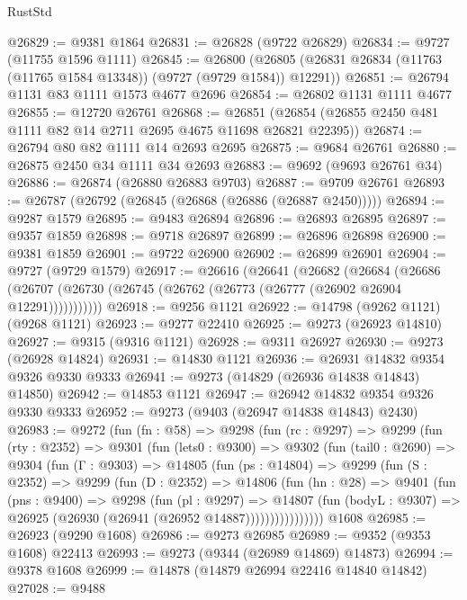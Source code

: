 \begin{lexlean}{RustStd}
\begin{coremodule}
{\begin{coremodule}
{{{{{{{{{{{{{{{{{{{{{{{{{{{{{{{{{{{{{{{{{{{{{{{{{{{{{{{@26829 := @9381 @1864
@26831 := @26828 (@9722 @26829)
@26834 := @9727 (@11755 @1596 @1111)
@26845 := @26800
    (@26805 (@26831 @26834 (@11763 (@11765 @1584 @13348)) (@9727 (@9729 @1584)) @12291))
@26851 := @26794 @1131 @83 @1111 @1573 @4677 @2696
@26854 := @26802 @1131 @1111 @4677
@26855 := @12720 @26761
@26868 := @26851 (@26854 (@26855 @2450 @481 @1111 @82 @14 @2711 @2695 @4675 @11698 @26821 @22395))
@26874 := @26794 @80 @82 @1111 @14 @2693 @2695
@26875 := @9684 @26761
@26880 := @26875 @2450 @34 @1111 @34 @2693
@26883 := @9692 (@9693 @26761 @34)
@26886 := @26874 (@26880 @26883 @9703)
@26887 := @9709 @26761
@26893 := @26787 (@26792 (@26845 (@26868 (@26886 (@26887 @2450)))))
@26894 := @9287 @1579
@26895 := @9483 @26894
@26896 := @26893 @26895
@26897 := @9357 @1859
@26898 := @9718 @26897
@26899 := @26896 @26898
@26900 := @9381 @1859
@26901 := @9722 @26900
@26902 := @26899 @26901
@26904 := @9727 (@9729 @1579)
@26917 := @26616
    (@26641
      (@26682
        (@26684
          (@26686 (@26707 (@26730 (@26745 (@26762 (@26773 (@26777 (@26902 @26904 @12291)))))))))))
@26918 := @9256 @1121
@26922 := @14798 (@9262 @1121) (@9268 @1121)
@26923 := @9277 @22410
@26925 := @9273 (@26923 @14810)
@26927 := @9315 (@9316 @1121)
@26928 := @9311 @26927
@26930 := @9273 (@26928 @14824)
@26931 := @14830 @1121
@26936 := @26931 @14832 @9354 @9326 @9330 @9333
@26941 := @9273 (@14829 (@26936 @14838 @14843) @14850)
@26942 := @14853 @1121
@26947 := @26942 @14832 @9354 @9326 @9330 @9333
@26952 := @9273 (@9403 (@26947 @14838 @14843) @2430)
@26983 := @9272
    (fun (fn : @58) =>
    @9298
      (fun (rc : @9297) =>
      @9299
        (fun (rty : @2352) =>
        @9301
          (fun (lets0 : @9300) =>
          @9302
            (fun (tail0 : @2690) =>
            @9304
              (fun (Γ : @9303) =>
              @14805
                (fun (ps : @14804) =>
                @9299
                  (fun (S : @2352) =>
                  @9299
                    (fun (D : @2352) =>
                    @14806
                      (fun (hn : @28) =>
                      @9401
                        (fun (pns : @9400) =>
                        @9298
                          (fun (pl : @9297) =>
                          @14807
                            (fun (bodyL : @9307) =>
                            @26925 (@26930 (@26941 (@26952 @14887))))))))))))))))
    @1608
@26985 := @26923 (@9290 @1608)
@26986 := @9273 @26985
@26989 := @9352 (@9353 @1608) @22413
@26993 := @9273 (@9344 (@26989 @14869) @14873)
@26994 := @9378 @1608
@26999 := @14878 (@14879 @26994 @22416 @14840 @14842)
@27028 := @9488
}}}}}}}}}}}}}}}}}}}}}}}}}}}}}}}}}}}}}}}}}}}}}}}}}}}}}}}
\end{coremodule}}
\end{coremodule}
\end{lexlean}
